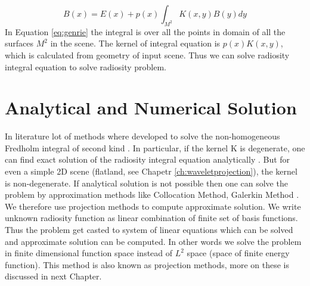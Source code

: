 \begin{equation} \label{eq:genrie}
B(x)=E(x)+p(x)\int_{M^2}K(x,y)B(y)dy
\end{equation}
In Equation \ref{eq:genrie} the integral is over all the points in domain of all  the surfaces $M^2$ in the scene. The kernel of integral equation is $p(x)K(x,y)$, which is calculated from geometry of input scene. Thus we can solve radiosity integral equation to solve radiosity problem.


\section{Analytical and Numerical Solution}
In literature lot of methods where developed to solve the non-homogeneous Fredholm integral of second kind \cite{iesurvey} \cite{ie}. In particular, if the kernel K is degenerate, one can find exact solution of the radiosity integral equation analytically \cite{ie}. But for even a simple 2D  scene (flatland, see Chapetr \ref{ch:waveletprojection}), the kernel is non-degenerate. If analytical solution is not possible then one can solve the problem by approximation methods like Collocation Method, Galerkin Method \cite{iesurvey} \cite{ie}. We therefore use projection methods to compute approximate solution. We write unknown radiosity function as linear combination of finite set of  basis functions. Thus the problem get casted to system of linear equations which can be solved and approximate solution can be computed. In other words we solve the problem in finite dimensional function space instead of $L^2$ space (space of finite energy function). This method is also known as projection methods, more on these is discussed in next Chapter.

